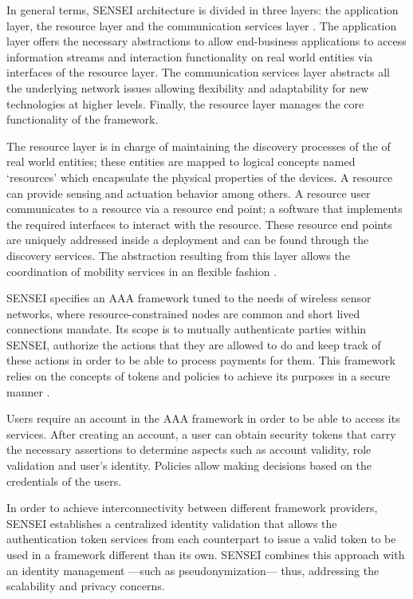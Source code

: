 \documentclass[journal]{IEEEtran}
\begin{document}
  In general terms, SENSEI architecture is divided in three layers: the application layer, the resource layer and the communication services layer \cite{Tsiatsis2010}. The application layer offers the necessary abstractions to allow end-business applications to access information streams and interaction functionality on real world entities via interfaces of the resource layer. The communication services layer abstracts all the underlying network issues allowing flexibility and adaptability for new technologies at higher levels. Finally, the resource layer manages the core functionality of the framework. 

  The resource layer is in charge of maintaining the discovery processes of the of real world entities; these entities are mapped to logical concepts named `resources' which encapsulate the physical properties of the devices. A resource can provide sensing and actuation behavior among others. A resource user communicates to a resource via a resource end point; a software that implements the required interfaces to interact with the resource. These resource end points are uniquely addressed inside a deployment and can be found through the discovery services. The abstraction resulting from this layer allows the coordination of mobility services in an flexible fashion \cite{Tsiatsis2010}. 
  
  SENSEI specifies an AAA framework tuned to the needs of wireless sensor networks, where resource-constrained nodes are common and short lived connections mandate. Its scope is to mutually authenticate parties within SENSEI, authorize the actions that they are allowed to do and keep track of these actions in order to be able to process payments for them. This framework relies on the concepts of tokens and policies to achieve its purposes in a secure manner \cite{Bauge2010}.

  Users require an account in the AAA framework in order to be able to access its services. After creating an account, a user can obtain security tokens that carry the necessary assertions to determine aspects such as account validity, role validation and user's identity. Policies allow making decisions based on the credentials of the users.

  In order to achieve interconnectivity between different framework providers, SENSEI establishes a centralized identity validation that allows the authentication token services from each counterpart to issue a valid token to be used in a framework different than its own. SENSEI combines this approach with an identity management ---such as pseudonymization--- thus, addressing the scalability and privacy concerns. 
\end{document}
